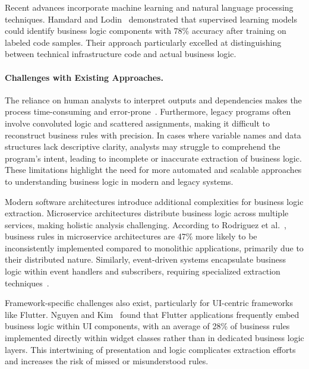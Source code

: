 \hspace{0.5cm} Recent advances incorporate machine learning and natural language processing techniques. Hamdard and Lodin~\cite{MLBusinessLogic} demonstrated that supervised learning models could identify business logic components with 78\% accuracy after training on labeled code samples. Their approach particularly excelled at distinguishing between technical infrastructure code and actual business logic.

\paragraph{Challenges with Existing Approaches.} The reliance on human analysts to interpret outputs and dependencies makes the process time-consuming and error-prone~\cite{BusinessRules}. Furthermore, legacy programs often involve convoluted logic and scattered assignments, making it difficult to reconstruct business rules with precision. In cases where variable names and data structures lack descriptive clarity, analysts may struggle to comprehend the program's intent, leading to incomplete or inaccurate extraction of business logic. These limitations highlight the need for more automated and scalable approaches to understanding business logic in modern and legacy systems.

\hspace{0.5cm} Modern software architectures introduce additional complexities for business logic extraction. Microservice architectures distribute business logic across multiple services, making holistic analysis challenging. According to Rodriguez et al.~\cite{MicroservicesBL}, business rules in microservice architectures are 47\% more likely to be inconsistently implemented compared to monolithic applications, primarily due to their distributed nature. Similarly, event-driven systems encapsulate business logic within event handlers and subscribers, requiring specialized extraction techniques~\cite{EventDrivenBL}.

\hspace{0.5cm} Framework-specific challenges also exist, particularly for UI-centric frameworks like Flutter. Nguyen and Kim~\cite{UIBusinessLogic} found that Flutter applications frequently embed business logic within UI components, with an average of 28\% of business rules implemented directly within widget classes rather than in dedicated business logic layers. This intertwining of presentation and logic complicates extraction efforts and increases the risk of missed or misunderstood rules.

